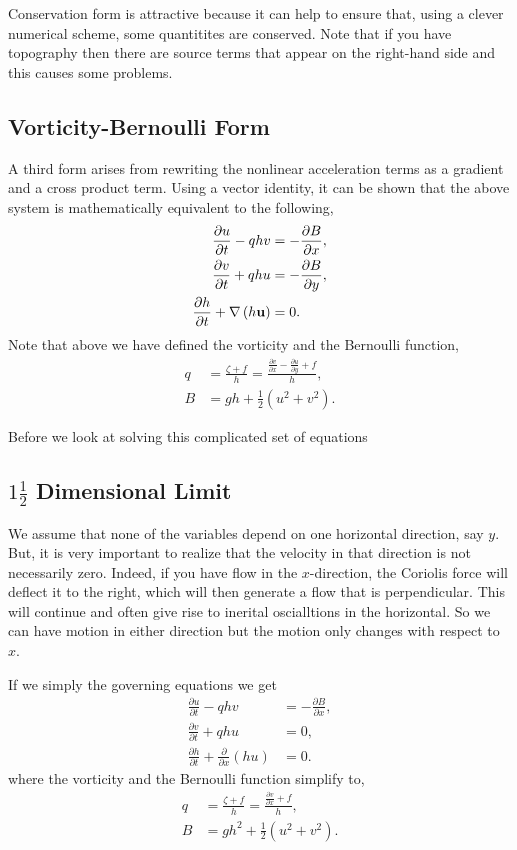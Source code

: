 \documentclass[11pt]{article}
\begin{document}
Conservation form is attractive because it can help to ensure that, using a clever numerical
scheme, some quantitites are conserved.  Note that if you have topography then there
are source terms that appear on the right-hand side and this causes some problems.

\subsection*{Vorticity-Bernoulli Form}

A third form arises from rewriting the nonlinear 
acceleration terms as a gradient and a cross product term.  Using a vector identity,
it can be shown that the above system is mathematically equivalent to the following,
\begin{align} 
\frac{\partial u}{\partial t}  - q h v 
&= - \frac{\partial B}{\partial x},\\
\frac{\partial v}{\partial t}  + q h u 
&= - \frac{\partial B}{\partial y},\\
\frac{\partial h}{\partial t} + \nabla \left( h \bf{u} \right) &= 0.
\end{align}
Note that above we have defined the vorticity and the Bernoulli function,
\begin{align}
q &= \frac{\zeta + f}{h} 
 = \frac{\frac{\partial v}{\partial x} - \frac{\partial u}{\partial y} + f}{h},\\
B & = g h + \frac12 \left( u^2 + v^2 \right).
\end{align}

Before we look at solving this complicated set of equations 

\subsection*{ $1 \frac12$ Dimensional Limit}

We assume that none of the variables depend on one horizontal direction, say $y$. 
But, it is very important to realize that the velocity in that direction is not necessarily zero.
Indeed, if you have flow in the $x$-direction, the Coriolis force will deflect it to the right,
which will then generate a flow that is perpendicular.  This will continue and often give rise
to inerital oscialltions in the horizontal.  So we can have motion in either direction but
the motion only changes with respect to $x$.  

If we simply the governing equations we get
\begin{align} 
\frac{\partial u}{\partial t}  - q h v 
&= - \frac{\partial B}{\partial x},\\
\frac{\partial v}{\partial t}  + q h u 
&= 0,\\
\frac{\partial h}{\partial t} + \frac{\partial}{\partial x} \left( h u \right) &= 0.
\end{align}
where the vorticity and the Bernoulli function simplify to,
\begin{align}
q & = \frac{\zeta + f}{h} = \frac{\frac{\partial v}{\partial x} + f}{h},\\
B & = g h^2 + \frac12 \left( u^2 + v^2 \right).
\end{align}
\end{document}
